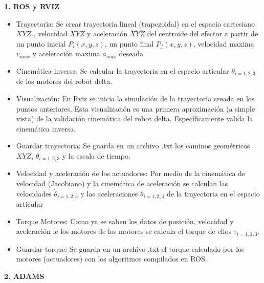         \item \textbf{1. ROS y RVIZ}
            \begin{itemize}
                \item {Trayectoria: Se crear trayectoria lineal (trapezoidal) en el espacio cartesiano $XYZ$ , velocidad $\dot{X}\dot{Y}\dot{Z}$ y aceleración $\ddot{X}\ddot{Y}\ddot{Z}$ del centroide del efector a partir de un punto inicial $P_i(x,y,z)$, un punto final $P_f(x,y,z)$, velocidad maxima $v_{max}$ y aceleración maxima $a_{max}$ deseada}
                \item {Cinemática inversa: Se calcular la trayectoria en el espacio articular $\theta_{i=1,2,3}$ de los motores del robot delta.}
                \item {Visualización: En Rviz se inicia la simulación de la trayectoria creada en los puntos anteriores. Esta visualización es una primera aproximación (a simple vista) de la validación cinemática del robot delta. Específicamente valida la cinemática inversa.}
                \item {Guardar trayectoria: Se guarda en un archivo .txt los caminos geométricos  $XYZ$, $\theta_{i=1,2,3}$ y la escala de tiempo.
                }
                \item {Velocidad y aceleración de los actuadores: Por medio de la cinemática de velocidad (Jacobiano) y la cinemática de aceleración se calculan las velocidades $\dot{\theta}_{i=1,2,3}$ y las aceleraciones $\ddot{\theta}_{i=1,2,3}$ de la trayectoria en el espacio articular}
                \item{ Torque Motores: Como ya se saben los datos de posición, velocidad y aceleración le los motores de los motores se calcula el torque de ellos $\tau_{i=1,2,3}$.}
                \item {Guardar torque: Se guarda en un archivo .txt el torque calculado por los motores (actuadores) con los algoritmos compilados en ROS.
                }
            \end{itemize}
        \item \textbf{2. ADAMS}
